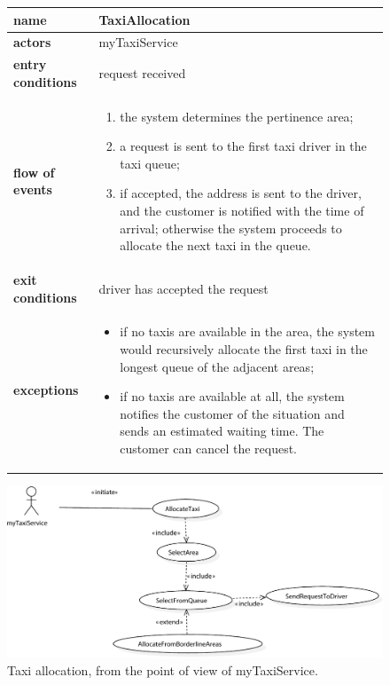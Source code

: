 \begin{figure}\begin{tabularx}{\textwidth}{ >{\bfseries}l X }\toprule%
	name				&	TaxiAllocation%
	\\ \midrule%
	actors				&	myTaxiService%
	\\ \midrule%
	entry conditions	&	request received%
	\\ \midrule%
	flow of events		&	\begin{enumerate}%
		\item the system determines the pertinence area;%
		\item a request is sent to the first taxi driver in the taxi queue;%
		\item if accepted, the address is sent to the driver, and the customer is notified with the time of arrival; otherwise the system proceeds to allocate the next taxi in the queue.%
	\end{enumerate} \\ \midrule%
	exit conditions		&	 driver has accepted the request%
	\\ \midrule%
	exceptions			&	\begin{itemize}%
		\item if no taxis are available in the area, the system would recursively allocate the first taxi in the longest queue of the adjacent areas;%
		\item if no taxis are available at all, the system notifies the customer of the situation and sends an estimated waiting time. The customer can cancel the request.%
	\end{itemize} \\ \bottomrule%
\end{tabularx}\end{figure}


\begin{figure}%
	\includegraphics[width=\textwidth]{img/U_TaxiAllocation}%
	\caption{Taxi allocation, from the point of view of myTaxiService.}%
\end{figure}


